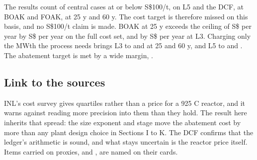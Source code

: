 The results count \vTargetPass{} of \vTargetN{} central cases at or below S\$100/t, on L5 and the DCF, at BOAK and FOAK, at 25 y and 60 y. The cost target is therefore missed on this basis, and no S\$100/t claim is made. BOAK at 25 y exceeds the ceiling of S\$ per year by S\$ per year on the full cost set, and by S\$ per year at L3. Charging only the \vQRB{} MWth the process needs brings L3 to \vAcThreeNeedBT{} and \vAcThreeNeedBS{} at 25 and 60 y, and L5 to \vAcFiveNeedBT{} and \vAcFiveNeedBS. The abatement target is met by a wide margin, .

\subsection*{Link to the sources}
INL's cost survey gives quartiles rather than a price for a 925 C reactor, and it warns against reading more precision into them than they hold. The result here inherits that spread: the size exponent and stage move the abatement cost by more than any plant design choice in Sections I to K. The DCF confirms that the ledger's arithmetic is sound, and what stays uncertain is the reactor price itself. Items carried on proxies,  and , are named on their cards.
